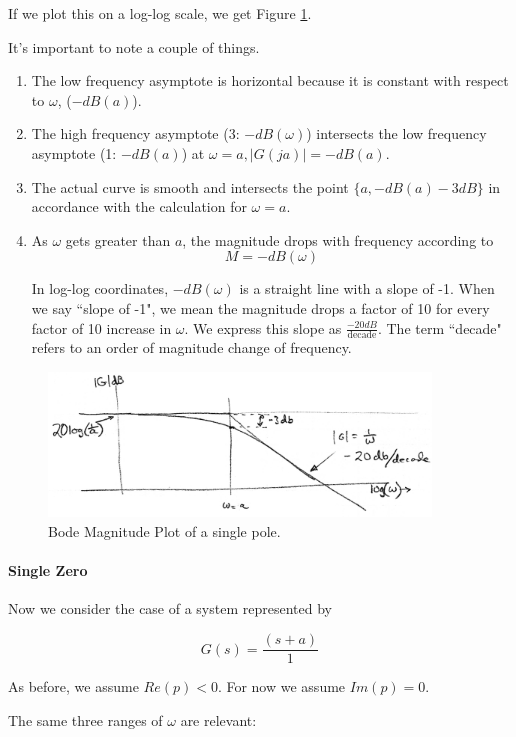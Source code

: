 If we plot this on a log-log scale, we get Figure \ref{BodeMagOnePole}.

It's important to note a couple of things.

\begin{enumerate}
  \item The low frequency asymptote is horizontal because it is constant with respect to $\omega$, ($-dB(a)$).
  \item The high frequency asymptote (3: $-dB(\omega)$) intersects
         the low frequency asymptote (1: $-dB(a)$) at $\omega = a, |G(ja)| = -dB(a)$.
  \item The actual curve is smooth and intersects the point $\{a, -dB(a)-3dB\}$ in accordance with
  the calculation for  $\omega = a$.
  \item As $\omega$ gets greater than $a$, the magnitude drops with frequency according to
  $$ M = -dB(\omega) $$

In log-log coordinates, $-dB(\omega)$ is a straight line with a slope of -1.  When we say ``slope of -1", we mean the magnitude drops a factor of 10 for every factor of 10 increase in $\omega$.   We express this slope as $\frac{-20dB}{\mathrm{decade}}$. The term ``decade" refers to an order of magnitude change of frequency.

\end{enumerate}


\begin{figure}\centering
\includegraphics[width=4.0in]{figs05/00734a.png}
\caption{Bode Magnitude Plot of a single pole.}\label{BodeMagOnePole}
\end{figure}


\paragraph{Single Zero}
Now we consider the case of a system represented by

\[
G(s) = \frac{(s+a)}{1}
\]

As before, we assume $Re(p) < 0$.  For now we assume $Im(p) = 0$.

The same three ranges of $\omega$ are relevant:

